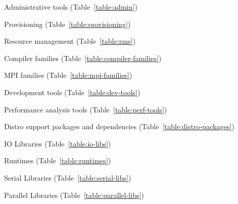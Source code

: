 \begin{itemize*}
\item Administrative tools (Table~\ref{table:admin})
\item Provisioning (Table~\ref{table:provisioning})
\item Resource management (Table~\ref{table:rms})
\item Compiler families (Table~\ref{table:compiler-families})
\item MPI families (Table~\ref{table:mpi-families})
\item Development tools (Table~\ref{table:dev-tools})
\item Performance analysis tools (Table~\ref{table:perf-tools})
\item Distro support packages and dependencies (Table~\ref{table:distro-packages})
\item IO Libraries (Table~\ref{table:io-libs})
\item Runtimes (Table~\ref{table:runtimes})
\item Serial Libraries (Table~\ref{table:serial-libs})
\item Parallel Libraries (Table~\ref{table:parallel-libs})
\end{itemize*}
